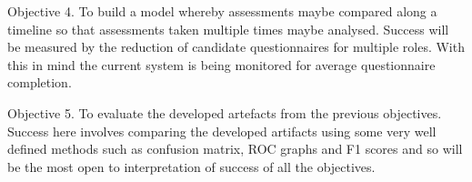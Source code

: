 \documentclass{ruthesis}
\begin{document}
Objective 4. To build a model whereby assessments maybe compared along a timeline so that assessments taken multiple times maybe analysed. Success will be measured by the reduction of candidate questionnaires for multiple roles. With this in mind the current system is being monitored for average questionnaire completion.

Objective 5. To evaluate the developed artefacts from the previous objectives. Success here involves comparing the developed artifacts using some very well defined methods such as confusion matrix, ROC graphs and F1 scores and so will be the most open to interpretation of success of all the objectives.

















\vspace{8pt}
\end{document}
